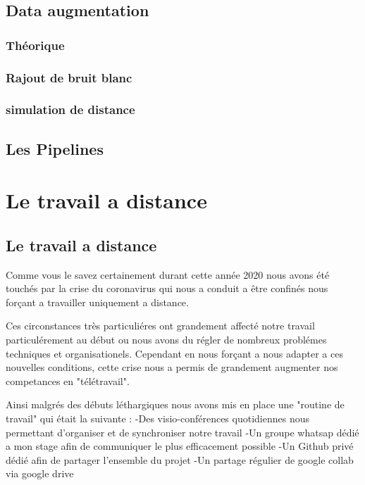 \section{Data augmentation}

\subsection{Théorique}

\subsection{Rajout de bruit blanc}

\subsection{simulation de distance}

\section{Les Pipelines}





\chapter{Le travail a distance}\label{Le travail à distance}
\section{Le travail a distance}


Comme vous le savez certainement durant cette année 2020 nous avons été touchés par la crise du coronavirus qui nous a conduit a être confinés nous forçant a travailler uniquement a distance.

Ces circonstances très particuliéres ont grandement affecté notre travail particulérement au début ou nous avons du régler de nombreux problémes techniques et organisationels. Cependant en nous forçant a nous adapter a ces nouvelles conditions, cette crise nous a permis de grandement augmenter nos competances en "télétravail".

Ainsi malgrés des débuts léthargiques nous avons mis en place une "routine de travail" qui était la suivante :
-Des visio-conférences quotidiennes nous permettant d'organiser et de synchroniser notre travail
-Un groupe whatsap dédié a mon stage afin de communiquer le plus efficacement possible
-Un Github privé dédié afin de partager l'ensemble du projet
-Un partage régulier de google collab via google drive



